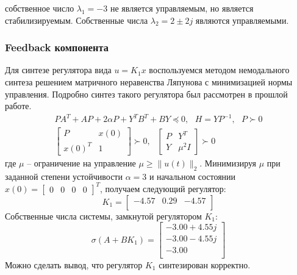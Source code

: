 собственное число $\lambda_1 = -3$ не является управляемым, но является стабилизируемым. 
Собственные числа $\lambda_2 = 2 \pm 2j$ являются управляемыми. 

\subsubsection{Feedback компонента}
Для синтезе регулятора вида $u = K_1x$ воспользуемся методом немодального синтеза решением матричного неравенства Ляпунова с 
минимизацией нормы управления. Подробно синтез такого регулятора был рассмотрен в прошлой работе. 
\begin{equation}
    \begin{array}{cc}
        PA^T + AP + 2\alpha P + Y^T B^T + BY \preceq 0, ~~~ H = Y P^{-1}, ~~~ P \succ 0 \\ 
        \begin{bmatrix}
            P & x(0) \\
            x(0)^T & 1
        \end{bmatrix} \succ 0, ~~~ \begin{bmatrix}
            P & Y^T \\ 
            Y & \mu^2I
        \end{bmatrix} \succ 0
    \end{array}
\end{equation} 
где $\mu$ -- ограничение на управление $\mu \ge \|u(t)\|_2$.
Минимизируя $\mu$ при заданной степени устойчивости $\alpha = 3$ и начальном 
состоянии $x(0) = \begin{bmatrix}0 & 0 & 0 & 0\end{bmatrix}^T$, получаем следующий регулятор: 
\begin{equation}
    K_1 = \begin{bmatrix}
        -4.57  & 0.29  & -4.57 \\ 
    \end{bmatrix}
\end{equation}
Собственные числа системы, замкнутой регулятором $K_1$:
\begin{equation}
    \sigma(A + BK_1) = \begin{bmatrix}
        -3.00 + 4.55j \\ 
        -3.00 - 4.55j \\ 
        -3.00 \\ 
    \end{bmatrix}
\end{equation}
Можно сделать вывод, что регулятор $K_1$ синтезирован корректно. 
